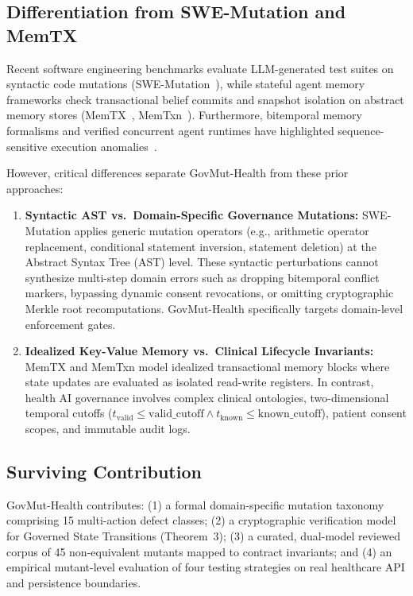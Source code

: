 \documentclass[runningheads]{llncs}
\begin{document}
\subsection{Differentiation from SWE-Mutation and MemTX}
Recent software engineering benchmarks evaluate LLM-generated test suites on syntactic code mutations (SWE-Mutation~\cite{swemutation}), while stateful agent memory frameworks check transactional belief commits and snapshot isolation on abstract memory stores (MemTX~\cite{memtx}, MemTxn~\cite{memtxn}). Furthermore, bitemporal memory formalisms and verified concurrent agent runtimes have highlighted sequence-sensitive execution anomalies~\cite{toki,verifiedconcurrency}.

However, critical differences separate GovMut-Health from these prior approaches:
\begin{enumerate}
    \item \textbf{Syntactic AST vs.\ Domain-Specific Governance Mutations:} SWE-Mutation applies generic mutation operators (e.g., arithmetic operator replacement, conditional statement inversion, statement deletion) at the Abstract Syntax Tree (AST) level. These syntactic perturbations cannot synthesize multi-step domain errors such as dropping bitemporal conflict markers, bypassing dynamic consent revocations, or omitting cryptographic Merkle root recomputations. GovMut-Health specifically targets domain-level enforcement gates.
    \item \textbf{Idealized Key-Value Memory vs.\ Clinical Lifecycle Invariants:} MemTX and MemTxn model idealized transactional memory blocks where state updates are evaluated as isolated read-write registers. In contrast, health AI governance involves complex clinical ontologies, two-dimensional temporal cutoffs ($t_{\text{valid}} \le \text{valid\_cutoff} \land t_{\text{known}} \le \text{known\_cutoff}$), patient consent scopes, and immutable audit logs.
\end{enumerate}

\subsection{Surviving Contribution}
GovMut-Health contributes: (1) a formal domain-specific mutation taxonomy comprising 15 multi-action defect classes; (2) a cryptographic verification model for Governed State Transitions (Theorem~3); (3) a curated, dual-model reviewed corpus of 45 non-equivalent mutants mapped to contract invariants; and (4) an empirical mutant-level evaluation of four testing strategies on real healthcare API and persistence boundaries.
\end{document}
